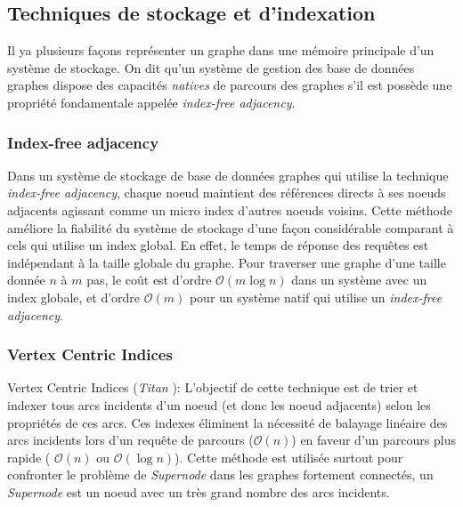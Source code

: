   \subsection{Techniques de stockage et d'indexation}
  \label{sec:graph-internals}
  Il ya plusieurs façons représenter un graphe dans une mémoire
  principale d'un système de stockage. On dit qu'un système de gestion
  des base de données graphes dispose des capacités \emph{natives} de
  parcours des graphes s'il est possède une propriété fondamentale
  appelée \emph{index-free adjacency}.

  
  \newpage

    \subsubsection{Index-free adjacency}
    \label{sec:index-free}
    Dans un système de stockage de base de données graphes qui utilise
    la technique \emph{index-free adjacency}, chaque noeud maintient
    des références directs à ses noeuds adjacents agissant comme un
    micro index d'autres noeuds voisins. Cette méthode améliore la
    fiabilité du système de stockage d'une façon considérable
    comparant à cels qui utilise un index global. En effet, le temps
    de réponse des requêtes est indépendant à la taille globale du
    graphe. Pour traverser une graphe d'une taille donnée $n$ à $m$
    pas, le coût est d'ordre $\mathcal{O}(m\log{}n)$ dans un système
    avec un index globale, et d'ordre $\mathcal{O}(m)$ pour un système
    natif qui utilise un \emph{index-free adjacency}.

    

    \subsubsection{Vertex Centric Indices}
    \label{sec:vertex}        %

    Vertex Centric Indices (\emph{Titan} \cite{vertexci}): L'objectif
    de cette technique est de trier et indexer tous arcs incidents
    d'un noeud (et donc les noeud adjacents) selon les propriétés de
    ces arcs. Ces indexes éliminent la nécessité de balayage linéaire
    des arcs incidents lors d'un requête de parcours
    ($\mathcal{O}(n)$) en faveur d'un parcours plus rapide (
    $\mathcal{O}(n)$ ou $\mathcal{O}(\log{}n)$). Cette méthode est
    utilisée surtout pour confronter le problème de \emph{Supernode}
    dans les graphes fortement connectés, un \emph{Supernode} est un
    noeud avec un très grand nombre des arcs incidents.

